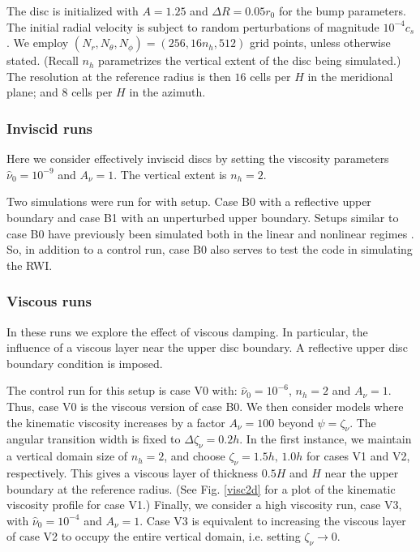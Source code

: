 The disc is initialized with $A=1.25$ and $\Delta R = 0.05r_0$ for the
bump parameters. The initial radial velocity is subject to random
perturbations of magnitude $10^{-4}c_s$. We employ $(N_r, N_\theta,
N_\phi)=(256,16n_h,512)$   
grid points, unless otherwise stated. 
(Recall $n_h$ parametrizes the vertical extent of the disc being
simulated.) The resolution at the reference radius is then $16$ cells
per $H$ in the meridional plane; and $8$ cells per $H$ in the azimuth. 


\subsubsection{Inviscid runs}
Here we consider effectively inviscid discs by setting the viscosity
parameters $\hat{\nu}_0=10^{-9}$ and $A_\nu = 1$. The vertical extent
is $n_h=2$.     

Two simulations were run for with setup. Case B0 with a
reflective upper boundary and case B1 with an unperturbed upper
boundary. Setups similar to case B0 have previously been simulated both in the
linear and nonlinear regimes  \citep{meheut12, lin13}. So, in addition
to a control run, case B0 also serves to test the \pluto code in
simulating the RWI.  

\subsubsection{Viscous runs}
In these runs we explore the effect of viscous damping. In particular,
the influence of a viscous layer near the upper disc boundary. 
A reflective upper disc boundary condition is imposed.  

The control run for this setup is case V0 with: $\hat{\nu}_0=10^{-6}$,
$n_h=2$ and $A_\nu = 1$. Thus, case V0 is the viscous version of case 
B0. We then consider models where the kinematic viscosity increases by
a factor $A_\nu=100$ beyond $\psi=\zeta_\nu$. The angular transition
width is fixed to $\Delta\zeta_\nu=0.2h$. In the first instance, we
maintain a vertical domain size of $n_h=2$, and choose
$\zeta_\nu=1.5h,\,1.0h$ for cases V1 and V2, respectively. This gives a
viscous layer of thickness $0.5H$ and $H$ near the upper boundary at
the reference radius. (See Fig. \ref{visc2d} for a plot of the
kinematic viscosity profile for case V1.) Finally, we consider a high
viscosity run, case V3, with $\hat{\nu}_0=10^{-4}$ and $A_\nu=1$. Case
V3 is equivalent to increasing the viscous layer of case V2 to occupy
the entire vertical domain, i.e. setting $\zeta_\nu\to 0$.
 
